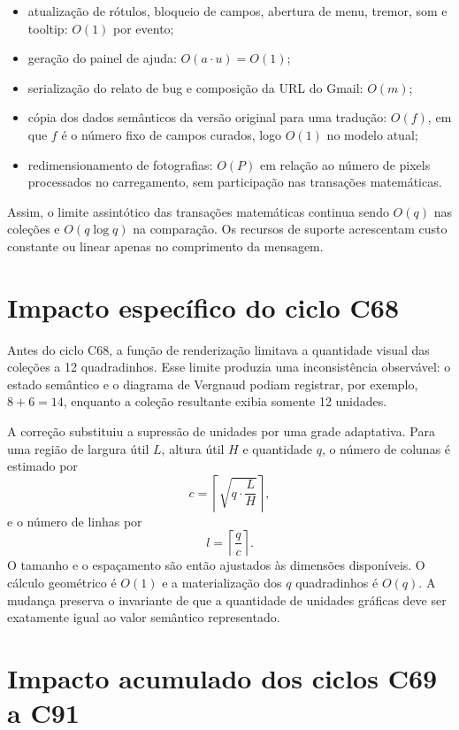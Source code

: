 \documentclass[12pt,a4paper]{article}
\begin{document}
\begin{itemize}[noitemsep]
  \item atualização de rótulos, bloqueio de campos, abertura de menu, tremor, som e tooltip: $O(1)$ por evento;
  \item geração do painel de ajuda: $O(a\cdot u)=O(1)$;
  \item serialização do relato de bug e composição da URL do Gmail: $O(m)$;
  \item cópia dos dados semânticos da versão original para uma tradução: $O(f)$, em que $f$ é o número fixo de campos curados, logo $O(1)$ no modelo atual;
  \item redimensionamento de fotografias: $O(P)$ em relação ao número de pixels processados no carregamento, sem participação nas transações matemáticas.
\end{itemize}

Assim, o limite assintótico das transações matemáticas continua sendo $O(q)$ nas coleções e $O(q\log q)$ na comparação. Os recursos de suporte acrescentam custo constante ou linear apenas no comprimento da mensagem.

\section{Impacto específico do ciclo C68}

Antes do ciclo C68, a função de renderização limitava a quantidade visual das coleções a 12 quadradinhos. Esse limite produzia uma inconsistência observável: o estado semântico e o diagrama de Vergnaud podiam registrar, por exemplo, $8+6=14$, enquanto a coleção resultante exibia somente 12 unidades.

A correção substituiu a supressão de unidades por uma grade adaptativa. Para uma região de largura útil $L$, altura útil $H$ e quantidade $q$, o número de colunas é estimado por
\[
c=\left\lceil\sqrt{q\cdot\frac{L}{H}}\right\rceil,
\]
e o número de linhas por
\[
l=\left\lceil\frac{q}{c}\right\rceil.
\]
O tamanho e o espaçamento são então ajustados às dimensões disponíveis. O cálculo geométrico é $O(1)$ e a materialização dos $q$ quadradinhos é $O(q)$. A mudança preserva o invariante de que a quantidade de unidades gráficas deve ser exatamente igual ao valor semântico representado.


\section{Impacto acumulado dos ciclos C69 a C91}
\end{document}
